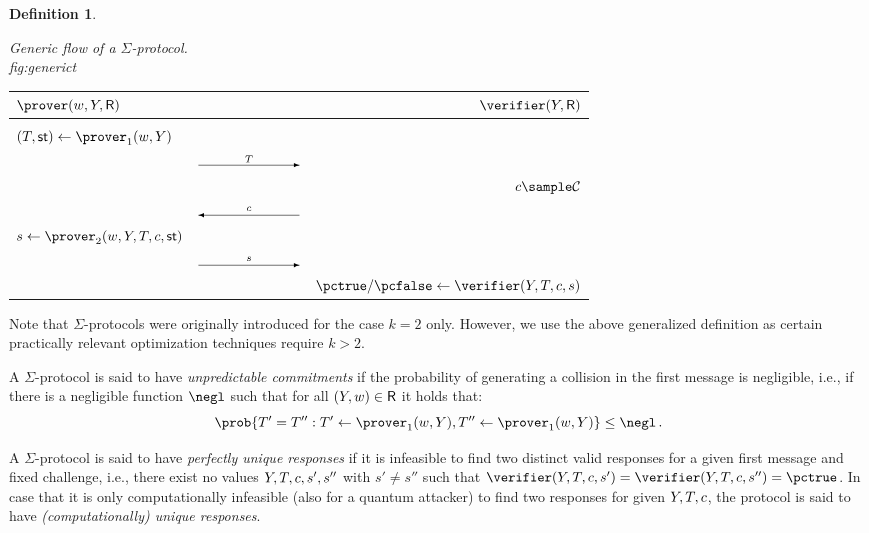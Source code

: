\documentclass[runningheads,11pt]{article}
\newtheorem{definition}{Definition}
\begin{document}
\begin{definition}
\begin{description}
  \end{description}
    \begin{protocol}{Generic flow of a $\Sigma$-protocol.\\[-2.25em]}{fig:generic}{t}
      \begin{tabular}{@{}l@{\hspace{-2em}}c@{\hspace{-2em}}r@{}}
        $\prover(\witness,Y,\relation)$ & & $\verifier(Y,\relation)$  \\
        \hline  \\
        $(\commitment,\st) \gets \prover_1(\witness,\statement)$\\
        & $\sendr{T}{100}$ \\[2 ex]
        & & $c \sample \CS$ \\
        & $\sendl{c}{100}$ & \\[2 ex]
        $ s \gets \prover_2(\witness,\statement,\commitment,\challenge,\st)$\\
        & $\sendr{s}{100}$ \\[2 ex]
        & & $\accept/\reject \gets \verifier(\statement,\commitment,\challenge,s)$ \\
      \end{tabular}
    \end{protocol}
\end{definition}
Note that $\Sigma$-protocols were originally introduced for the case $k=2$ only.
However, we use the above generalized definition as certain practically relevant optimization techniques require $k>2$.

A $\Sigma$-protocol is said to have \emph{unpredictable commitments} if the probability of generating a collision in the first message is negligible, i.e., if there is a negligible function $\negl$ such that for all $(Y,w)\in\mathsf{R}$ it holds that:
\[
  \prob{T'=T'' : T'\gets\prover_1(\witness,\statement), T''\gets\prover_1(\witness,\statement)} \leq \negl\,.
\]

A $\Sigma$-protocol is said to have \emph{perfectly unique responses} if it is infeasible to find two distinct valid responses for a given first message and fixed challenge, i.e., there exist no values $Y,T,c,s',s''$ with $s'\ne s''$ such that $\verifier(\statement,\commitment,\challenge,s')=\verifier(\statement,\commitment,\challenge,s'')=\accept$.
In case that it is only computationally infeasible (also for a quantum attacker) to find two responses for given $Y, T,c$, the protocol is said to have \emph{(computationally) unique responses}.
\end{document}
